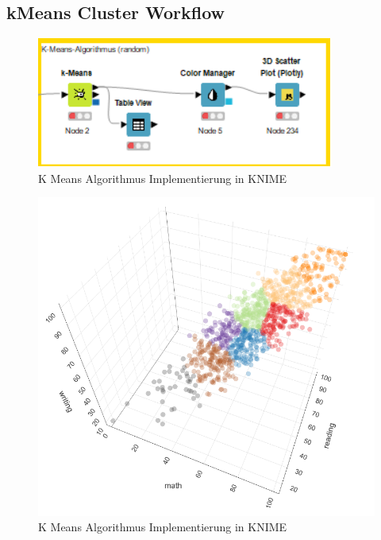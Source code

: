\documentclass[12pt,					%
							 oneside,			%
							 a4paper,			%
							 halfparskip,		%
							 liststotoc,			%
							 bibtotoc,			%
							 fleqn,				%
							 pointlessnumbers]	%
							 {scrreprt}
\begin{document}
		\subsection{kMeans Cluster Workflow}
		
		\begin{figure}[!h]
		\includegraphics[scale=1]{pictures/kmeans.png}
		\caption{K Means Algorithmus Implementierung in KNIME}
		\end{figure}
		
		\begin{figure}[!h]
		\includegraphics[scale=0.6]{pictures/cluster.png}
		\caption{K Means Algorithmus Implementierung in KNIME}
		\end{figure}
\end{document}
